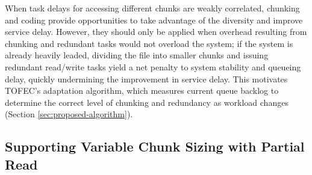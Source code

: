 \documentclass[journal]{IEEEtran}
\newcommand{\comment}[1]{}
\newcommand{\ourproposal}{TOFEC\xspace}
\begin{document}
\comment{
In FAST CLOUD, the chunk size for each file is assumed to be predetermined and fixed, so it is plausible and cost-effective to treat each coded chunk as a individual object. However, this approach (referred as ``unique key'' hereafter) will easily be too expensive if more than one chunk sizes are to be supported because its storage cost grows linearly to the number of chunk sizes. For example, suppose we want to support downloading of a 3MB file using 3 chunk sizes of 3MB (no chunking), 1.5MB and 1MB ($k = 1, 2, 3$) and a maximum redundancy ratio of 2 ($n\le 2k$). One needs to create 2 objects of 3MB, 4 objects of 1.5MB and 6 objects of 1MB, resulting in a total storage cost of 18MB which is $6\times$ of the original file size instead of the desired redundancy ratio of $2$.
}




\else

When task delays for accessing different chunks are weakly correlated, chunking and coding provide opportunities to take advantage of the diversity and improve service delay. However, they should only be applied when overhead resulting from chunking and redundant tasks would not overload the system; if the system is already heavily leaded, dividing the file into smaller chunks and issuing redundant read/write tasks yield a net penalty to system stability and queueing delay, quickly undermining the improvement in service delay.
This motivates \ourproposal's adaptation algorithm, which measures current queue backlog to determine the correct level of chunking and redundancy as workload changes (Section \ref{sec:proposed-algorithm}). 


\subsection{Supporting Variable Chunk Sizing with Partial Read}
\label{ssec:measurement:partialRead}
\end{document}

